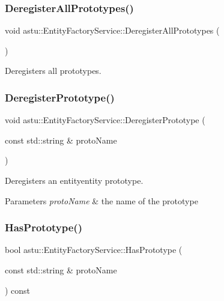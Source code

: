\subsubsection{\texorpdfstring{Deregister\+All\+Prototypes()}{DeregisterAllPrototypes()}}
{\footnotesize\ttfamily void astu\+::\+Entity\+Factory\+Service\+::\+Deregister\+All\+Prototypes (\begin{DoxyParamCaption}{ }\end{DoxyParamCaption})}

Deregisters all prototypes. \mbox{\label{classastu_1_1EntityFactoryService_a0256f46b4344c1f66d1d6ed947992c62}} 
\subsubsection{\texorpdfstring{Deregister\+Prototype()}{DeregisterPrototype()}}
{\footnotesize\ttfamily void astu\+::\+Entity\+Factory\+Service\+::\+Deregister\+Prototype (\begin{DoxyParamCaption}\item[{const std\+::string \&}]{proto\+Name }\end{DoxyParamCaption})}

Deregisters an entityentity prototype.


\begin{DoxyParams}{Parameters}
{\em proto\+Name} & the name of the prototype \\
\hline
\end{DoxyParams}
\mbox{\label{classastu_1_1EntityFactoryService_aa1b33aaf444b5d42e774522f0862df4a}} 
\subsubsection{\texorpdfstring{Has\+Prototype()}{HasPrototype()}}
{\footnotesize\ttfamily bool astu\+::\+Entity\+Factory\+Service\+::\+Has\+Prototype (\begin{DoxyParamCaption}\item[{const std\+::string \&}]{proto\+Name }\end{DoxyParamCaption}) const}

